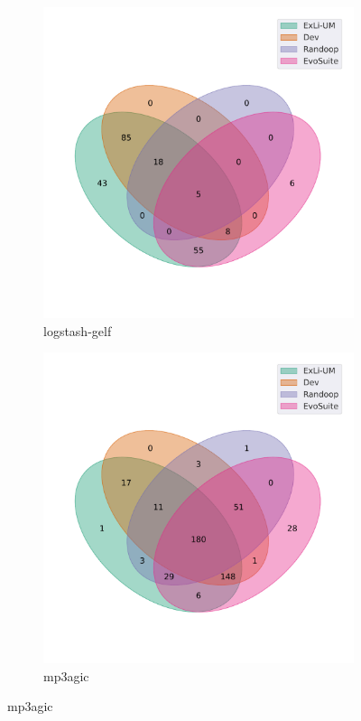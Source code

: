 \begin{figure}[t]\ContinuedFloat
\begin{subfigure}[b]{0.45\textwidth}
\includegraphics[width=\textwidth]{figures/venn/mp911de_logstash-gelf-venn.pdf}
\vspace{-10pt}
\caption{logstash-gelf}
\label{fig:venn-mp911de_logstash-gelf}
\end{subfigure}
\hfill
\begin{subfigure}[b]{0.45\textwidth}
\includegraphics[width=\textwidth]{figures/venn/mpatric_mp3agic-venn.pdf}
\vspace{-10pt}
\caption{mp3agic}
\label{fig:venn-mpatric_mp3agic}
\end{subfigure}
\end{figure}
